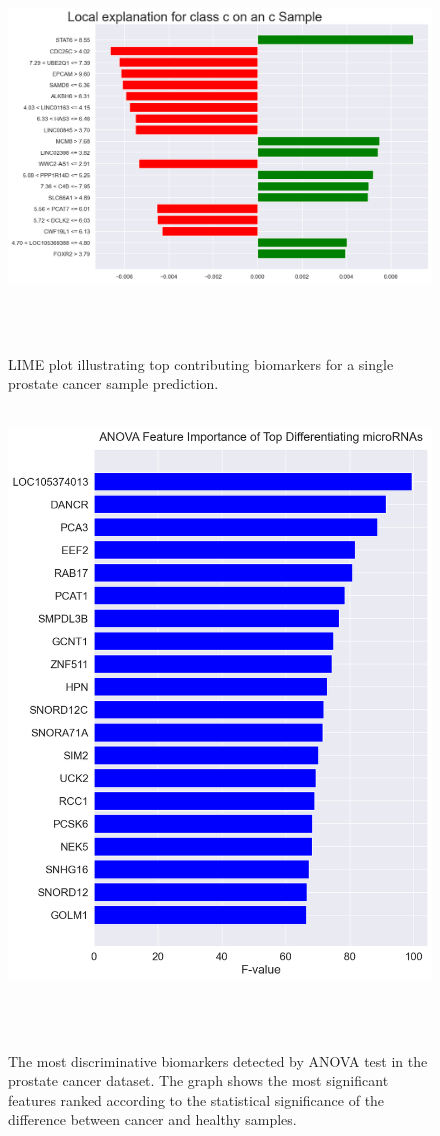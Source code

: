 \documentclass[journal]{IEEEtran}
\begin{document}

\begin{figure}[htbp]
 \centering
 \includegraphics[width=1\linewidth]{prostate_cancer_figures/differential/lime_local_explanation_plot_c.png}
 \caption{LIME plot illustrating top contributing biomarkers for a single prostate cancer sample prediction.}
 \label{fig:prostate_lime_bar}
\end{figure}

\begin{figure}[htbp]
 \centering
 \includegraphics[width=0.9\linewidth]{prostate_cancer_figures/differential/anova_features_plot.png}
 \caption{The most discriminative biomarkers detected by ANOVA test in the prostate cancer dataset. The graph shows the most significant features ranked according to the statistical significance of the difference between cancer and healthy samples.}
 \label{fig:prostate_anova_features}
\end{figure}
\end{document}
